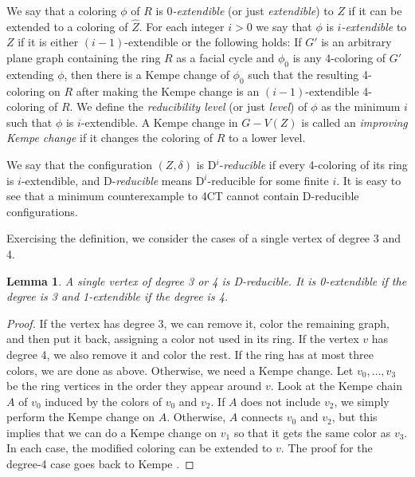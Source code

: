 \documentclass[10pt,a4paper]{article}
\newtheorem{lem}[thm]{Lemma}
\begin{document}
We say that a coloring $\phi$ of $R$ is \emph{$0$-extendible} (or just \emph{extendible}) to $Z$ if it can be extended to a coloring of $\widehat Z$. For each integer $i>0$ we say that $\phi$ is \emph{$i$-extendible} to $Z$ if it is either $(i-1)$-extendible or the following holds: If $G'$ is an arbitrary plane graph containing the ring $R$ as a facial cycle and $\phi_0$ is any 4-coloring of $G'$ extending $\phi$, then there is a Kempe change of $\phi_0$ such that the resulting
4-coloring on $R$ after making the Kempe change is an $(i-1)$-extendible 4-coloring of $R$. We define the \emph{reducibility level} (or just \emph{level}) of $\phi$ as the minimum $i$ such that $\phi$ is $i$-extendible.
A Kempe change in $G-V(Z)$ is called an \emph{improving Kempe change} if it changes the coloring of $R$ to a lower level.

We say that the configuration $(Z,\delta)$ is D$^i$-\emph{reducible} if every 4-coloring of its ring is $i$-extendible, and D-\emph{reducible} means D$^i$-reducible for some finite $i$.
It is easy to see \cite{AllaireSwart78,Franklin1922} that a minimum counterexample to 4CT cannot contain D-reducible configurations.

Exercising the definition, we consider the cases of a single vertex of degree 3 and 4. 

\begin{lem}\label{lem:3-4}
    A single vertex of degree 3 or 4 is D-reducible. It is 0-extendible if the degree is 3 and 1-extendible if the degree is 4.
\end{lem}

\begin{proof}
    If the vertex has degree 3, we can remove it, color the remaining graph, and then put it back, assigning a color not used in its ring.
    If the vertex $v$ has degree 4, we also remove it and color the rest. If the ring has at most three
    colors, we are done as above. Otherwise, we need a Kempe change. Let $v_0,\ldots, v_3$ be the ring vertices in the order they appear 
    around $v$. Look at the Kempe chain $A$ of $v_0$ induced by the colors of $v_0$ and $v_2$. If $A$ does not include $v_2$, we simply perform the Kempe change on $A$. Otherwise, $A$ connects $v_0$ and $v_2$, but this implies that we can do a Kempe change on $v_1$ so that it gets the same color as $v_3$. In each case, the modified coloring can be extended to $v$. The proof for the degree-4 case goes back to Kempe \cite{kempe1879}.
\end{proof}
\end{document}
